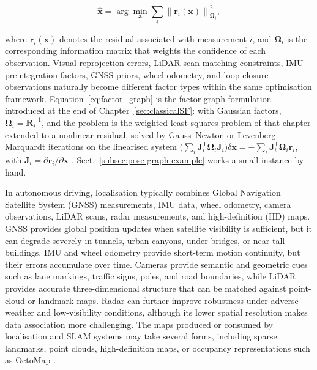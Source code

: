 \documentclass[graybox,envcountchap]{style/SNmono}
\begin{document}
\begin{equation}
\hat{\mathbf{x}}
=
\arg\min_{\mathbf{x}}
\sum_i
\left\|
\mathbf{r}_i(\mathbf{x})
\right\|_{\mathbf{\Omega}_i}^{2},
\label{eq:factor_graph}
\end{equation}

where $\mathbf{r}_i(\mathbf{x})$ denotes the residual associated with measurement $i$, and $\mathbf{\Omega}_i$ is the corresponding information matrix that weights the confidence of each observation. Visual reprojection errors, LiDAR scan-matching constraints, IMU preintegration factors, GNSS priors, wheel odometry, and loop-closure observations naturally become different factor types within the same optimisation framework. Equation~\eqref{eq:factor_graph} is the factor-graph formulation introduced at the end of Chapter~\ref{sec:classicalSF}: with Gaussian factors, $\mathbf{\Omega}_i=\mathbf{R}_i^{-1}$, and the problem is the weighted least-squares problem of that chapter extended to a nonlinear residual, solved by Gauss--Newton or Levenberg--Marquardt iterations on the linearised system $\big(\sum_i\mathbf{J}_i^{\mathsf T}\mathbf{\Omega}_i\mathbf{J}_i\big)\delta\mathbf{x}=-\sum_i\mathbf{J}_i^{\mathsf T}\mathbf{\Omega}_i\mathbf{r}_i$, with $\mathbf{J}_i=\partial\mathbf{r}_i/\partial\mathbf{x}$ \cite{grisetti2010_graphslam,dellaert2017_factor_graphs}. Sect.~\ref{subsec:pose-graph-example} works a small instance by hand.

In autonomous driving, localisation typically combines Global Navigation Satellite System (GNSS) measurements, IMU data, wheel odometry, camera observations, LiDAR scans, radar measurements, and high-definition (HD) maps. GNSS provides global position updates when satellite visibility is sufficient, but it can degrade severely in tunnels, urban canyons, under bridges, or near tall buildings. IMU and wheel odometry provide short-term motion continuity, but their errors accumulate over time. Cameras provide semantic and geometric cues such as lane markings, traffic signs, poles, and road boundaries, while LiDAR provides accurate three-dimensional structure that can be matched against point-cloud or landmark maps. Radar can further improve robustness under adverse weather and low-visibility conditions, although its lower spatial resolution makes data association more challenging. The maps produced or consumed by localisation and SLAM systems may take several forms, including sparse landmarks, point clouds, high-definition maps, or occupancy representations such as OctoMap \cite{hornung2013_octomap}.
\end{document}
